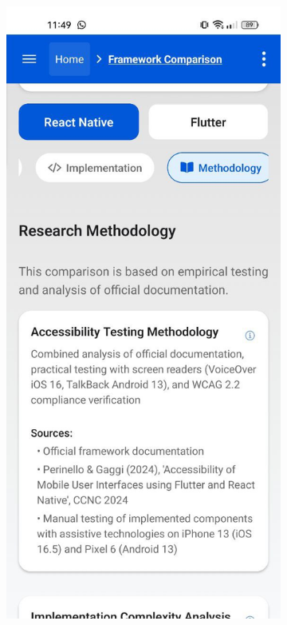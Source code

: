 \begin{figure}[ht]
    \centering
    \begin{subfigure}[b]{0.48\textwidth}
        \centering
        \includegraphics[width=\linewidth, alt={Methodology tab of the Framework Comparison screen}]{img/methodology1.jpg}

\end{subfigure}
\end{figure}
